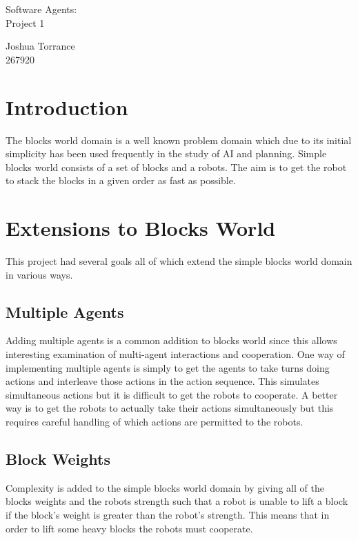 \documentclass{article}
\begin{document}
	\begin{center}
		\huge
		Software Agents:\\
		Project 1
	\end{center}

	\begin{flushright}
		\normalsize
		Joshua Torrance\\
		267920
	\end{flushright}


\section{Introduction}

The blocks world domain is a well known problem domain which due to its initial
simplicity has been used frequently in the study of AI and planning. Simple
blocks world consists of a set of blocks and a robots. The aim is to get the robot
to stack the blocks in a given order as fast as possible.

\section{Extensions to Blocks World}
This project had several goals all of which extend the simple blocks world domain
in various ways.

\subsection{Multiple Agents}

Adding multiple agents is a common addition to blocks world since this allows interesting examination
of multi-agent interactions and cooperation. One way of implementing multiple
agents is simply to get the agents to take turns doing actions and interleave
those actions in the action sequence. This simulates simultaneous actions but
it is difficult to get the robots to cooperate. A better way is to get the robots
to actually take their actions simultaneously but this requires careful handling of which actions
are permitted to the robots.


\subsection{Block Weights}

Complexity is added to the simple blocks world domain by giving all of the
blocks weights and the robots strength such that a robot is unable to
lift a block if the block's weight is greater than the robot's strength. This means that in order to lift some heavy
blocks the robots must cooperate.
\end{document}
